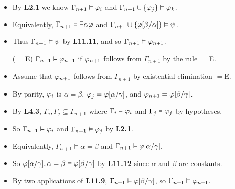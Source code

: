 \documentclass[a4paper, 11pt]{article} %
\begin{document}
\begin{itemize}
    \item By \textbf{L2.1} we know $\Gamma_{n+1} \vDash \varphi_i$ and $\Gamma_{n+1}\cup\lbrace\varphi_j\rbrace \vDash \varphi_k$.
    \item Equivalently, $\Gamma_{n+1} \vDash \exists \alpha\varphi$ and $\Gamma_{n+1}\cup\lbrace\varphi[\beta/\alpha]\rbrace \vDash \psi$.
    \item Thus $\Gamma_{n+1}\vDash\psi$ by \textbf{L11.11}, and so $\Gamma_{n+1}\vDash\varphi_{n+1}$.
  \item[($=$E)] $\Gamma_{n+1} \vDash \varphi_{n+1}$ if $\varphi_{n+1}$ follows from $\Gamma_{n+1}$ by the rule $=$E. 
    \item Assume that $\varphi_{n+1}$ follows from $\Gamma_{n+1}$ by existential elimination $=$E.
    \item By parity, $\varphi_i$ is $\alpha=\beta$, $\varphi_j=\varphi[\alpha/\gamma]$, and $\varphi_{n+1}=\varphi[\beta/\gamma]$.
    \item By \textbf{L4.3}, $\Gamma_i,\Gamma_j\subseteq \Gamma_{n+1}$ where $\Gamma_i\vDash\varphi_i$ and $\Gamma_j\vDash\varphi_j$ by hypotheses.
    \item So $\Gamma_{n+1} \vDash \varphi_i$ and $\Gamma_{n+1} \vDash \varphi_j$ by \textbf{L2.1}.
    \item Equivalently, $\Gamma_{n+1} \vDash \alpha = \beta$ and $\Gamma_{n+1} \vDash \varphi[\alpha/\gamma]$.
    \item So $\varphi[\alpha/\gamma], \alpha = \beta \vDash \varphi[\beta/\gamma]$ by \textbf{L11.12} since $\alpha$ and $\beta$ are constants.
    \item By two applications of \textbf{L11.9}, $\Gamma_{n+1}\vDash\varphi[\beta/\gamma]$, so $\Gamma_{n+1}\vDash\varphi_{n+1}$.
\end{itemize}
\end{document}
